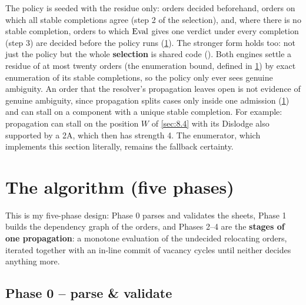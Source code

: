 \documentclass[12pt,a4paper]{article}
\begin{document}
The policy is seeded with the residue only: orders decided beforehand, orders on which all stable completions agree (step 2 of the selection), and, where there is no stable completion, orders to which $\operatorname{Eval}$ gives one verdict under every completion (step 3) are decided before the policy runs (\cref{sec:6}).
The stronger form holds too: not just the policy but the whole \textbf{selection} is shared code ().
Both engines settle a residue of at most twenty orders (the enumeration bound, defined in \cref{sec:6}) by exact enumeration of its stable completions, so the policy only ever sees genuine ambiguity.
An order that the resolver's propagation leaves open is not evidence of genuine ambiguity, since propagation splits cases only inside one admission (\cref{sec:6}) and can stall on a component with a unique stable completion.
For example: propagation can stall on the position $W$ of \cref{sec:8.4} with its Dislodge also supported by a 2A, which then has strength 4.
The enumerator, which implements this section literally, remains the fallback certainty.

\section{The algorithm (five phases)}\label{sec:6}

This is my five-phase design: Phase 0 parses and validates the sheets, Phase 1 builds the dependency graph of the orders, and Phases 2--4 are the \textbf{stages of one propagation}: a monotone evaluation of the undecided relocating orders, iterated together with an in-line commit of vacancy cycles until neither decides anything more.

\subsection*{Phase 0 -- parse \& validate}\label{sec:6.phase0}
\end{document}
